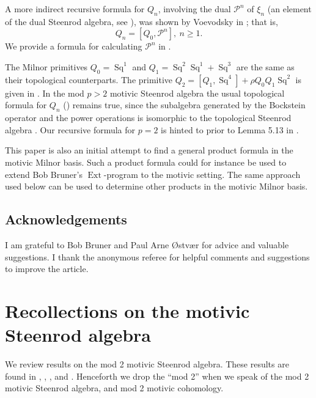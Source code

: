 \documentclass[11pt,hyp]{nyjm}
\newcommand{\PP}{\mathcal{P}}
\newcommand{\Ext}{\operatorname{Ext}}
\newcommand{\Sq}{\operatorname{Sq}}
\theoremstyle{theoremstyle}
\theoremstyle{definition}
\theoremstyle{theoremstyle}
\begin{document}
A more indirect recursive formula for $Q_n$, involving the dual $\PP^n$ of $\xi_n$ (an element of the dual Steenrod algebra, see ),
was shown by Voevodsky in \cite[Proposition 13.6]{Voevodsky:power}; that is,
\[
Q_n = [Q_0, \PP^n],\ n \geq 1.
\]
We provide a formula for calculating $\PP^n$ in .

The Milnor primitives $Q_0 = \Sq^1$ and $Q_1 = \Sq^2 \Sq^1 + \Sq^3$ are the same as their topological counterparts.
The primitive $Q_2 = [Q_1, \Sq^4] + \rho Q_0Q_1 \Sq^2$ is given in \cite[Example 13.7]{Voevodsky:power}.
In the mod $p > 2$ motivic Steenrod algebra the usual topological formula for $Q_n$ (\cite[Corollary 2]{Milnor}) remains true, since the subalgebra generated by the Bockstein operator and the power operations is isomorphic to the topological Steenrod algebra \cite[Theorem 10.3]{Voevodsky:power}.
Our recursive formula for $p = 2$ is hinted to prior to Lemma 5.13 in \cite{Voevodsky:Z/l}.

This paper is also an initial attempt to find a general product formula in the motivic Milnor basis. Such a product formula could for instance be used to extend Bob Bruner's $\Ext$-program \cite{Bruner} to the motivic setting. The same approach used below can be used to determine other products in the motivic Milnor basis.
\subsection*{Acknowledgements}
I am grateful to Bob Bruner and Paul Arne {\O}stv{\ae}r for advice and valuable suggestions.
I thank the anonymous referee for helpful comments and suggestions to improve the article.
\section{Recollections on the motivic Steenrod algebra}
We review results on the mod 2 motivic Steenrod algebra. These results are found in \cite{Voevodsky:power}, \cite{Voevodsky:Z/l}, \cite{Riou}, \cite{HKO} and \cite{Spitzweck}.
Henceforth we drop the ``mod 2'' when we speak of the mod 2 motivic Steenrod algebra, and mod 2 motivic cohomology.
\end{document}
